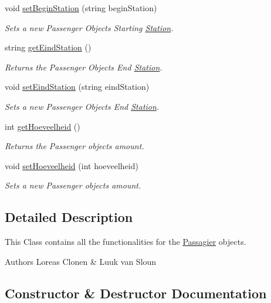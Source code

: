 \begin{DoxyCompactItemize}
void \hyperlink{classPassagier_afc4826ff4dacbbe15f15f6e8ef338ff0}{set\+Begin\+Station} (string begin\+Station)
\begin{DoxyCompactList}\small\item\em Sets a new Passenger Object\textquotesingle{}s Starting \hyperlink{classStation}{Station}. \end{DoxyCompactList}\item 
string \hyperlink{classPassagier_a721949463e02e122567c9967786a8a38}{get\+Eind\+Station} ()
\begin{DoxyCompactList}\small\item\em Returns the Passenger Object\textquotesingle{}s End \hyperlink{classStation}{Station}. \end{DoxyCompactList}\item 
void \hyperlink{classPassagier_a93606f0982849fc1838b5e16ab5f1b12}{set\+Eind\+Station} (string eind\+Station)
\begin{DoxyCompactList}\small\item\em Sets a new Passenger Object\textquotesingle{}s End \hyperlink{classStation}{Station}. \end{DoxyCompactList}\item 
int \hyperlink{classPassagier_a1fd825eaa3db5b68cc24ca297e45d198}{get\+Hoeveelheid} ()
\begin{DoxyCompactList}\small\item\em Returns the Passenger object\textquotesingle{}s amount. \end{DoxyCompactList}\item 
void \hyperlink{classPassagier_adf498b0e24ef821f30e479591da7a3d3}{set\+Hoeveelheid} (int hoeveelheid)
\begin{DoxyCompactList}\small\item\em Sets a new Passenger object\textquotesingle{}s amount. \end{DoxyCompactList}\end{DoxyCompactItemize}


\subsection{Detailed Description}
This Class contains all the functionalities for the \hyperlink{classPassagier}{Passagier} objects. 

\begin{DoxyAuthor}{Authors}
Loreas Clonen \& Luuk van Sloun 
\end{DoxyAuthor}


\subsection{Constructor \& Destructor Documentation}
